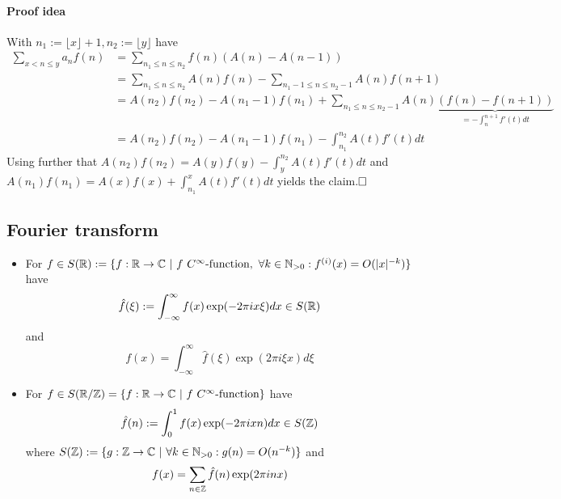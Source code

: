 \paragraph{Proof idea} With $n_1 := \lfloor x \rfloor + 1, n_2 := \lfloor y \rfloor$ have
\begin{align*}
    \sum_{x < n \leq y} a_n f(n) &= \sum_{n_1 \leq n \leq n_2} f(n)(A(n) - A(n - 1)) \\
    &= \sum_{n_1 \leq n \leq n_2} A(n) f(n) - \sum_{n_1 - 1 \leq n \leq n_2 - 1} A(n) f(n + 1) \\
    &= A(n_2) f(n_2) - A(n_1 - 1) f(n_1) + \sum_{n_1 \leq n \leq n_2 - 1} A(n) \underbrace{(f(n) - f(n + 1))}_{= -\int_n^{n+1} f'(t) dt} \\
    &= A(n_2) f(n_2) - A(n_1 - 1) f(n_1) - \int_{n_1}^{n_2} A(t) f'(t) dt
\end{align*}
Using further that $A(n_2) f(n_2) = A(y) f(y) - \int_y^{n_2} A(t) f'(t) dt$ and $A(n_1) f(n_1) = A(x) f(x) + \int_{n_1}^x A(t) f'(t) dt$ yields the claim.$\hfill\square$

\subsection{Fourier transform}
\begin{itemize}
    \item For $f \in S(\mathbb{R}) := \{ f: \mathbb{R} \to \mathbb{C} \ | \ f \ \text{$C^\infty$-function}, \ \forall k \in \mathbb{N}_{> 0}: f^{(i)}(x) = O(|x|^{-k}) \}$ have
    \begin{equation*}
        \hat{f}(\xi) := \int_{-\infty}^{\infty} f(x) \exp(-2\pi i x \xi) dx \in S(\mathbb{R})
    \end{equation*}
    and
    \begin{equation*}
        f(x) = \int_{-\infty}^{\infty} \hat{f}(\xi) \exp(2\pi i \xi x) d\xi
    \end{equation*}
    \item For $f \in S(\R/\Z) = \{ f: \R \to \C \ | \ f \ \text{$C^\infty$-function}\}$ have
    \begin{equation*}
        \hat{f}(n) := \int_0^1 f(x) \exp(-2\pi i x n) dx \in S(\mathbb{Z})
    \end{equation*}
    where $S(\mathbb{Z}) := \{ g: \mathbb{Z} \to \mathbb{C} \ | \ \forall k \in \mathbb{N}_{> 0}: g(n) = O(n^{-k})\}$ and
    \begin{equation*}
        f(x) = \sum_{n \in \mathbb{Z}} \hat{f}(n) \exp(2\pi i n x)
    \end{equation*}
\end{itemize}

